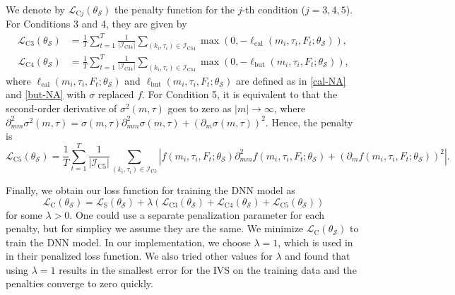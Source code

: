 \documentclass[11pt,a4paper]{article}
\theoremstyle{remark}
\begin{document}
We denote by $\mathcal{L}_{\mathrm{C}j}(\theta_{\mathcal{S}})$ the penalty function for the $j$-th condition ($j=3,4,5$). For Conditions 3 and 4, they are given by
\begin{align}
	\mathcal{L}_{\mathrm{C} 3}(\theta_{\mathcal{S}})&=\frac{1}{T}\sum_{t=1}^{T}\frac{1}{\left|\mathcal{I}_{\mathrm{C} 34}\right|}\sum_{\left(k_{i}, \tau_{i}\right) \in \mathcal{I}_{\mathrm{C} 34}} \max \left(0,-\ell_{\mathrm{cal}}\left(m_{i}, \tau_{i}, F_t;\theta_{\mathcal{S}}\right)\right), \label{cal}\\
	\mathcal{L}_{\mathrm{C} 4}(\theta_{\mathcal{S}})&=\frac{1}{T}\sum_{t=1}^{T}\frac{1}{\left|\mathcal{I}_{\mathrm{C} 34}\right|}\sum_{\left(k_{i}, \tau_{i}\right) \in \mathcal{I}_{\mathrm{C} 34}} \max \left(0,-\ell_{\mathrm{but}}\left(m_{i}, \tau_{i}, F_t;\theta_{\mathcal{S}}\right)\right),  \label{but}
\end{align}
where $\ell_{\mathrm{cal}}\left(m_{i}, \tau_{i}, F_t;\theta_{\mathcal{S}}\right)$ and $\ell_{\mathrm{but}}\left(m_{i}, \tau_{i}, F_t;\theta_{\mathcal{S}}\right)$ are defined as in \eqref{cal-NA} and \eqref{but-NA} with $\sigma$ replaced $f$. For Condition 5, it is equivalent to that the second-order derivative of $\sigma^2(m, \tau)$ goes to zero as $|m|\to\infty$, where $\partial^{2}_{mm}\sigma^2(m, \tau) = \sigma(m, \tau)\partial^{2}_{mm}\sigma(m, \tau) +  (\partial_{m}\sigma(m, \tau))^2$. Hence, the penalty is
\begin{equation} 
	\mathcal{L}_{\mathrm{C} 5}(\theta_{\mathcal{S}})=\frac{1}{T}\sum_{t=1}^{T}\frac{1}{\left|\mathcal{I}_{\mathrm{C} 5}\right|}\sum_{\left(k_{i}, \tau_{i}\right) \in \mathcal{I}_{\mathrm{C} 5}}\left|f\left(m_{i}, \tau_{i}, F_{t};\theta_{\mathcal{S}}\right)\partial^{2}_{mm}f\left(m_{i}, \tau_{i}, F_{t};\theta_{\mathcal{S}} \right) + \left(\partial_m f\left(m_{i}, \tau_{i}, F_{t};\theta_{\mathcal{S}} \right)\right)^{2}\right|.  \label{asym}
\end{equation}

Finally, we obtain our loss function for training the DNN model as
\begin{equation}
\mathcal{L}_{\mathrm{C}}(\theta_{\mathcal{S}})=\mathcal{L}_{\mathrm{S}}(\theta_{\mathcal{S}})+\lambda(\mathcal{L}_{\mathrm{C}3}(\theta_{\mathcal{S}}) + \mathcal{L}_{\mathrm{C}4}(\theta_{\mathcal{S}}) + \mathcal{L}_{\mathrm{C}5}(\theta_{\mathcal{S}}) ) \label{L_S}
\end{equation}
for some $\lambda>0$. One could use a separate penalization parameter for each penalty, but for simplicy we assume they are the same. We minimize $\mathcal{L}_{\mathrm{C}}(\theta_{\mathcal{S}})$ to train the DNN model. In our implementation, we choose $\lambda=1$, which is used in \cite{deep_IVS} in their penalized loss function. We also tried other values for $\lambda$ and found that using $\lambda=1$ results in the smallest error for the IVS on the training data and the penalties converge to zero quickly.
\end{document}
